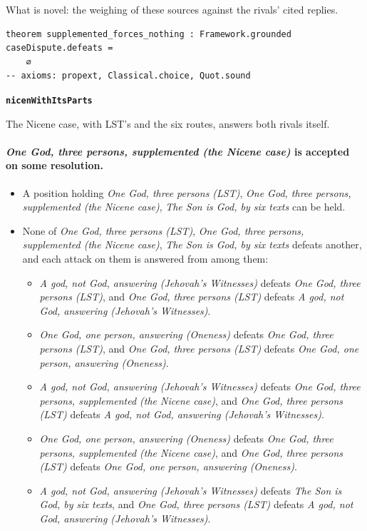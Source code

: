 \documentclass[11pt,paper=\testimonypaper,DIV=13,parskip=false]{scrartcl}
\begin{document}
What is novel: the weighing of these sources against the rivals’ cited replies.

{\small\begin{verbatim}
theorem supplemented_forces_nothing : Framework.grounded caseDispute.defeats =
    ∅
-- axioms: propext, Classical.choice, Quot.sound
\end{verbatim}}
\par\medskip\noindent\textbf{\texttt{nicen\allowbreak{}With\allowbreak{}Its\allowbreak{}Parts}}\par\nobreak\noindent
The Nicene case, with LST’s and the six routes, answers both rivals itself.

\paragraph{\emph{One God, three persons, supplemented (the Nicene case)} is accepted on some resolution.}
\begin{itemize}
\item A position holding \emph{One God, three persons (LST)}, \emph{One God, three persons, supplemented (the Nicene case)}, \emph{The Son is God, by six texts} can be held.
\item None of \emph{One God, three persons (LST)}, \emph{One God, three persons, supplemented (the Nicene case)}, \emph{The Son is God, by six texts} defeats another, and each attack on them is answered from among them:
\begin{itemize}
\item \emph{A god, not God, answering (Jehovah’s Witnesses)} defeats \emph{One God, three persons (LST)}, and \emph{One God, three persons (LST)} defeats \emph{A god, not God, answering (Jehovah’s Witnesses)}.
\item \emph{One God, one person, answering (Oneness)} defeats \emph{One God, three persons (LST)}, and \emph{One God, three persons (LST)} defeats \emph{One God, one person, answering (Oneness)}.
\item \emph{A god, not God, answering (Jehovah’s Witnesses)} defeats \emph{One God, three persons, supplemented (the Nicene case)}, and \emph{One God, three persons (LST)} defeats \emph{A god, not God, answering (Jehovah’s Witnesses)}.
\item \emph{One God, one person, answering (Oneness)} defeats \emph{One God, three persons, supplemented (the Nicene case)}, and \emph{One God, three persons (LST)} defeats \emph{One God, one person, answering (Oneness)}.
\item \emph{A god, not God, answering (Jehovah’s Witnesses)} defeats \emph{The Son is God, by six texts}, and \emph{One God, three persons (LST)} defeats \emph{A god, not God, answering (Jehovah’s Witnesses)}.
\end{itemize}
\end{itemize}
\end{document}
